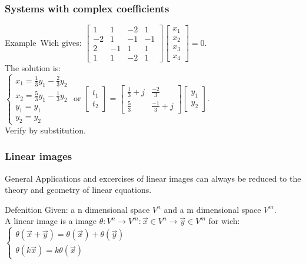 \begin{frame}
	\frametitle{Systems with complex coefficients}
	\begin{block}{Example}\
		Wich gives: $\begin{bmatrix}
		1 & 1 & -2 & 1\\
		-2 & 1 & -1 & -1 \\
		2 & -1 & 1 & 1\\
		1 & 1 & -2 & 1
		\end{bmatrix}\begin{bmatrix}
		x_1\\x_2\\x_3\\x_4
		\end{bmatrix}=0$. \\
		The solution is: \\
		$\begin{cases}
		x_1=\frac{1}{3}y_1-\frac{2}{3}y_2\\
		x_2=\frac{5}{3}y_1-\frac{1}{3}y_2\\
		y_1=y_1\\y_2=y_2
		\end{cases}$ or $\begin{bmatrix}
		t_1\\t_2
		\end{bmatrix}=\begin{bmatrix}
		\frac{1}{3}+j & \frac{-2}{3}\\
		\frac{5}{3} & \frac{-1}{3}+j
		\end{bmatrix}\begin{bmatrix}
		y_1\\y_2
		\end{bmatrix}$. \\
		Verify by substitution. 
	\end{block}
\end{frame}

\begin{frame}
	\frametitle{Linear images}
	\begin{block}{General}
		Applications and excercises of linear images can always be reduced to the theory and geometry of linear equations.
	\end{block}
	\begin{block}{Defenition}
		Given: a n dimensional space $V^n$ and a m dimensional space $V^m$. \\
		A linear image is a image $\theta: V^n \rightarrow V^m:\overrightarrow{x}\in V^n \rightarrow \overrightarrow{y} \in V^m$ for wich: $\begin{cases}
			\theta(\overrightarrow{x}+\overrightarrow{y})=\theta(\overrightarrow{x})+\theta(\overrightarrow{y})\\
			\theta(k\overrightarrow{x})=k\theta(\overrightarrow{x})
		\end{cases}$
	\end{block}
\end{frame}

